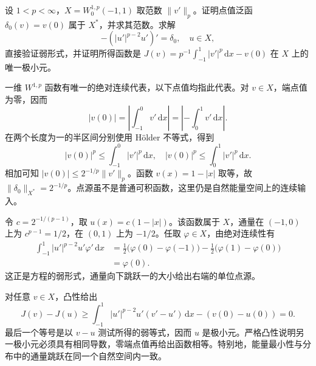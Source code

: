 \begin{exercise}\label{b2:ex:H2-point-source}
设 \(1<p<\infty\)，\(X=W_0^{1,p}(-1,1)\) 取范数 \(\|v'\|_p\)。证明点值泛函 \(\delta_0(v)=v(0)\) 属于 \(X^*\)，并求其范数。求解
\[
 -(|u'|^{p-2}u')'=\delta_0,
 \quad u\in X,
\]
直接验证弱形式，并证明所得函数是
\(J(v)=p^{-1}\int_{-1}^1|v'|^p\,\mathrm dx-v(0)\)
在 \(X\) 上的唯一极小元。
\end{exercise}
\begin{solution}
一维 \(W^{1,p}\) 函数有唯一的绝对连续代表，以下点值均指此代表。对 \(v\in X\)，端点值为零，因而
\[
 |v(0)|=\left|\int_{-1}^0v'\,\mathrm dx\right|
       =\left|-\int_0^1v'\,\mathrm dx\right|.
\]
在两个长度为一的半区间分别使用 Hölder 不等式，得到
\[
 |v(0)|^p\le\int_{-1}^0|v'|^p\,\mathrm dx,
 \quad
 |v(0)|^p\le\int_0^1|v'|^p\,\mathrm dx.
\]
相加可知 \(|v(0)|\le2^{-1/p}\|v'\|_p\)。函数 \(v(x)=1-|x|\) 取等，故 \(\|\delta_0\|_{X^*}=2^{-1/p}\)。点源虽不是普通可积函数，这里仍是自然能量空间上的连续输入。

令 \(c=2^{-1/(p-1)}\)，取 \(u(x)=c(1-|x|)\)。该函数属于 \(X\)，通量在 \((-1,0)\) 上为 \(c^{p-1}=1/2\)，在 \((0,1)\) 上为 \(-1/2\)。任取 \(\varphi\in X\)，由绝对连续性有
\begin{align*}
 \int_{-1}^1|u'|^{p-2}u'\varphi'\,\mathrm dx
 &=\frac12\bigl(\varphi(0)-\varphi(-1)\bigr)
   -\frac12\bigl(\varphi(1)-\varphi(0)\bigr)\\
 &=\varphi(0).
\end{align*}
这正是方程的弱形式，通量向下跳跃一的大小给出右端的单位点源。

对任意 \(v\in X\)，凸性给出
\[
 J(v)-J(u)\ge
 \int_{-1}^1|u'|^{p-2}u'(v'-u')\,\mathrm dx-(v(0)-u(0))=0.
\]
最后一个等号是以 \(v-u\) 测试所得的弱等式，因而 \(u\) 是极小元。严格凸性说明另一极小元必须具有相同导数，零端点值再给出函数相等。特别地，能量最小性与分布中的通量跳跃在同一个自然空间内一致。
\end{solution}

